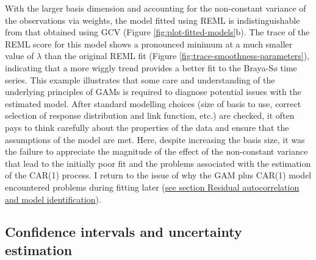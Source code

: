 \documentclass[12pt,]{article}
\begin{document}
With the larger basis dimension and accounting for the non-constant
variance of the observations via weights, the model fitted using REML is
indistinguishable from that obtained using GCV (Figure
\ref{fig:plot-fitted-models}b). The trace of the REML score for this
model shows a pronounced minimum at a much smaller value of \(\lambda\)
than the original REML fit (Figure
\ref{fig:trace-smoothness-parameters}), indicating that a more wiggly
trend provides a better fit to the Braya-Sø time series. This example
illustrates that some care and understanding of the underlying
principles of GAMs is required to diagnose potential issues with the
estimated model. After standard modelling choices (size of basis to use,
correct selection of response distribution and link function, etc.) are
checked, it often pays to think carefully about the properties of the
data and ensure that the assumptions of the model are met. Here, despite
increasing the basis size, it was the failure to appreciate the
magnitude of the effect of the non-constant variance that lead to the
initially poor fit and the problems associated with the estimation of
the CAR(1) process. I return to the issue of why the GAM plus CAR(1)
model encountered problems during fitting later
(\protect\hyperlink{identifiability}{see section Residual
autocorrelation and model identification}).

\hypertarget{confints}{\subsection{Confidence intervals and uncertainty
estimation}\label{confints}}
\end{document}
